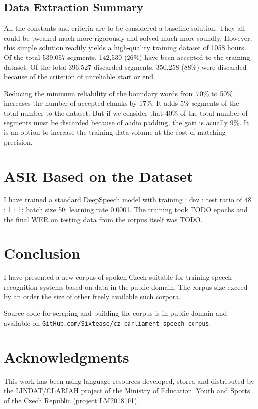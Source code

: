 \documentclass[runningheads,a4paper]{llncs}
\begin{document}
\subsection{Data Extraction Summary}

All the constants and criteria are to be considered a baseline solution. They
all could be tweaked much more rigorously and solved much more soundly. However,
this simple solution readily yields a high-quality training dataset of 1058
hours. Of the total 539,057 segments, 142,530 (26\%) have been accepted to the
training dataset. Of the total 396,527 discarded segments, 350,258 (88\%) were
discarded because of the criterion of unreliable start or end.

Reducing the minimum reliability of the boundary words from 70\% to 50\% increases
the number of accepted chunks by 17\%. It adds 5\% segments
of the total number to the dataset. But if we consider that 40\% of the total
number of segments must be discarded because of audio padding, the gain is
acually 9\%. It is an option to increase the training data volume at the cost
of matching precision.

\section{ASR Based on the Dataset}

I have trained a standard DeepSpeech\cite{hannun2014deep} model with training :
dev : test ratio of 48 : 1 : 1; batch size 50; learning rate 0.0001. The
training took TODO epochs and the final WER on testing data from the corpus
itself was TODO.

\section{Conclusion}

I have presented a new corpus of spoken Czech suitable for training speech
recognition systems based on data in the public domain. The corpus size exceed
by an order the size of other freely available such corpora.

Source code for scraping and building the corpus is in public domain and
available on \texttt{GitHub.com/Sixtease/cz-parliament-speech-corpus}.

\section*{Acknowledgments}

This work has been using language resources developed, stored and distributed by
the LINDAT/CLARIAH project of the Ministry of Education, Youth and Sports of the
Czech Republic (project LM2018101).




\end{document}
